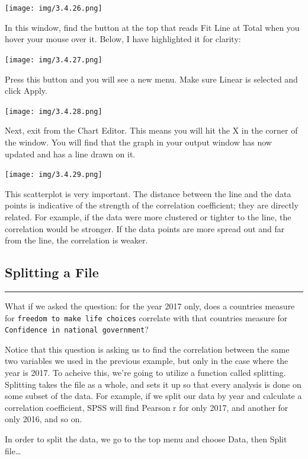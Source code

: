 \documentclass[]{book}
\begin{document}
\texttt{[image: img/3.4.26.png]}

In this window, find the button at the top that reads {Fit Line at
Total} when you hover your mouse over it. Below, I have highlighted it
for clarity:

\texttt{[image: img/3.4.27.png]}

Press this button and you will see a new menu. Make sure {Linear} is
selected and click {Apply}.

\texttt{[image: img/3.4.28.png]}

Next, exit from the Chart Editor. This means you will hit the {X} in the
corner of the window. You will find that the graph in your output window
has now updated and has a line drawn on it.

\texttt{[image: img/3.4.29.png]}

This scatterplot is very important. The distance between the line and
the data points is indicative of the strength of the correlation
coefficient; they are directly related. For example, if the data were
more clustered or tighter to the line, the correlation would be
stronger. If the data points are more spread out and far from the line,
the correlation is weaker.

\subsection{Splitting a File}\label{splitting-a-file}

\begin{center}\rule{0.5\linewidth}{0.5pt}\end{center}

What if we asked the question: for the year 2017 only, does a countries
measure for \texttt{freedom\ to\ make\ life\ choices} correlate with
that countries measure for
\texttt{Confidence\ in\ national\ government}?

Notice that this question is asking us to find the correlation between
the same two variables we used in the previous example, but only in the
case where the year is 2017. To acheive this, we're going to utilize a
function called splitting. Splitting takes the file as a whole, and sets
it up so that every analysis is done on some subset of the data. For
example, if we split our data by year and calculate a correlation
coefficient, SPSS will find Pearson r for only 2017, and another for
only 2016, and so on.

In order to split the data, we go to the top menu and choose {Data},
then {Split file\ldots{}}
\end{document}
